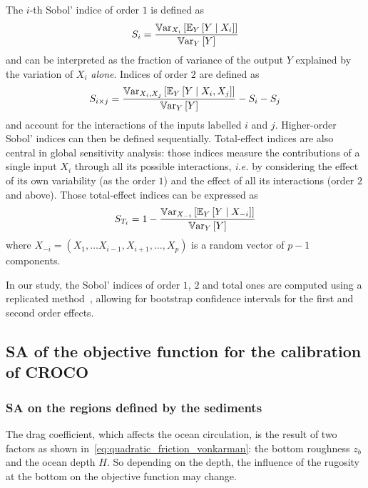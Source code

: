 \documentclass[../../Main_ManuscritThese.tex]{subfiles}
\newcommand{\zob}{z_b}
\begin{document}
The $i$-th Sobol' indice of order $1$ is defined
as~\citep{sobol_sensitivity_1993,sobol_global_2001}
\begin{equation}
  S_i = \frac{\mathbb{V}\mathrm{ar}_{X_i}\left[\mathbb{E}_{Y}\left[Y \mid X_i\right]\right]}{\mathbb{V}\mathrm{ar}_{Y}\left[Y\right]}
\end{equation}
and can be interpreted as the fraction of variance of the output
$Y$ explained by the variation of $X_i$ \emph{alone}. Indices of
order $2$ are defined as
\begin{equation}
  S_{i\times j} = \frac{\mathbb{V}\mathrm{ar}_{X_i, X_j}\left[\mathbb{E}_{Y}\left[Y \mid X_i, X_j\right]\right]}{\mathbb{V}\mathrm{ar}_{Y}\left[Y\right]} - S_i -S_j
\end{equation}
and account for the interactions of the inputs labelled $i$ and $j$.
Higher-order Sobol' indices can then be defined
sequentially. Total-effect indices are also central in global
sensitivity analysis: those indices measure the contributions of a
single input $X_i$ through all its possible interactions,
\textit{i.e.} by considering the effect of its own variability (as the
order $1$) and the effect of all its interactions (order $2$ and
above). Those total-effect indices can be expressed as
\begin{equation}
  S_{T_i} = 1 - \frac{\mathbb{V}\mathrm{ar}_{X_{-i}}\left[\mathbb{E}_{Y}\left[Y \mid X_{-i}\right]\right]}{\mathbb{V}\mathrm{ar}_{Y}\left[Y\right]}
\end{equation}
where $X_{-i} = (X_1,\dots X_{i-1},X_{i+1},\dots,X_p)$ is a random vector of $p-1$ components.

In our study, the Sobol' indices of order $1$, $2$ and total ones are
computed using a replicated
method~\citep{gilquin_making_2019,gilquin_echantillonnages_2016},
allowing for bootstrap confidence intervals for the first and second
order effects.

\subsection{SA of the objective function for the calibration of CROCO}
\subsubsection{SA on the regions defined by the sediments}
The drag coefficient, which affects the ocean circulation, is the
result of two factors as shown
in~\cref{eq:quadratic_friction_vonkarman}: the bottom roughness $\zob$
and the ocean depth $H$. So depending on the depth, the influence of
the rugosity at the bottom on the objective function may change.
\end{document}
